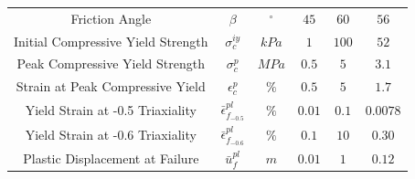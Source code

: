 \begin{table}[!htb]
\begin{tabulary}{\textwidth}{@{}cCCCCC@{}}
Friction Angle                     & $\beta$                          & $^{\circ}$     & $45$                                                            & $60$                                                            & $56$                                                              \\
Initial Compressive Yield Strength & $\sigma_c^{iy}$                  & $kPa$          & $1$                                                             & $100$                                                           & $52$                                                              \\
Peak Compressive Yield Strength    & $\sigma_c^{p}$                   & $MPa$          & $0.5$                                                           & $5$                                                             & $3.1$                                                             \\
Strain at Peak Compressive Yield   & $\epsilon_c^{p}$                 & $\%$           & $0.5$                                                           & $5$                                                             & $1.7$                                                             \\
Yield Strain at -0.5 Triaxiality   & $\bar{\epsilon}^{pl}_{f_{-0.5}}$ & $\%$           & $0.01$                                                          & $0.1$                                                           & $0.0078$                                                          \\
Yield Strain at -0.6 Triaxiality   & $\bar{\epsilon}^{pl}_{f_{-0.6}}$ & $\%$           & $0.1$                                                           & $10$                                                            & $0.30$                                                            \\
Plastic Displacement at Failure    & $\bar{u}^{pl}_f$                 & $m$            & $0.01$                                                          & $1$                                                             & $0.12$                                                            \\ \bottomrule
\end{tabulary}
\end{table}

